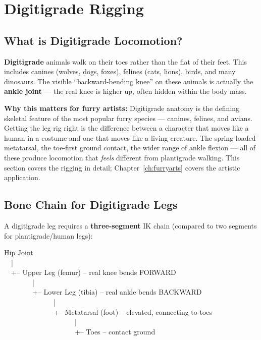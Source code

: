 \section{Digitigrade Rigging}
\label{sec:digitigrade}

\subsection{What is Digitigrade Locomotion?}

\textbf{Digitigrade} animals walk on their toes rather than the flat of their feet. This includes canines (wolves, dogs, foxes), felines (cats, lions), birds, and many dinosaurs. The visible ``backward-bending knee'' on these animals is actually the \textbf{ankle joint} --- the real knee is higher up, often hidden within the body mass.

\begin{furrybox}
\textbf{Why this matters for furry artists:} Digitigrade anatomy is the defining skeletal feature of the most popular furry species --- canines, felines, and avians. Getting the leg rig right is the difference between a character that moves like a human in a costume and one that moves like a living creature. The spring-loaded metatarsal, the toe-first ground contact, the wider range of ankle flexion --- all of these produce locomotion that \textit{feels} different from plantigrade walking. This section covers the rigging in detail; Chapter~\ref{ch:furryarts} covers the artistic application.
\end{furrybox}

\subsection{Bone Chain for Digitigrade Legs}

A digitigrade leg requires a \textbf{three-segment} IK chain (compared to two segments for plantigrade/human legs):

\begin{codebox}
Hip Joint\\
~~|\\
~~+-- Upper Leg (femur) -- real knee bends FORWARD\\
~~~~~~~~|\\
~~~~~~~~+-- Lower Leg (tibia) -- real ankle bends BACKWARD\\
~~~~~~~~~~~~~~|\\
~~~~~~~~~~~~~~+-- Metatarsal (foot) -- elevated, connecting to toes\\
~~~~~~~~~~~~~~~~~~~~|\\
~~~~~~~~~~~~~~~~~~~~+-- Toes -- contact ground
\end{codebox}

